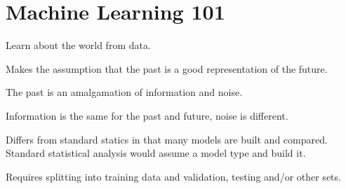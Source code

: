 	\chapter{Machine Learning 101}

	\begin{bulletedlist}
		\item Learn about the world from data.
		\item Makes the assumption that the past is a good representation of the future.
		\item The past is an amalgamation of information and noise.
		\item Information is the same for the past and future, noise is different.
		\item Differs from standard statics in that many models are built and compared.  Standard statistical analysis would assume a model type and build it.
		\item Requires splitting into training data and validation, testing and/or other sets.
	\end{bulletedlist}
